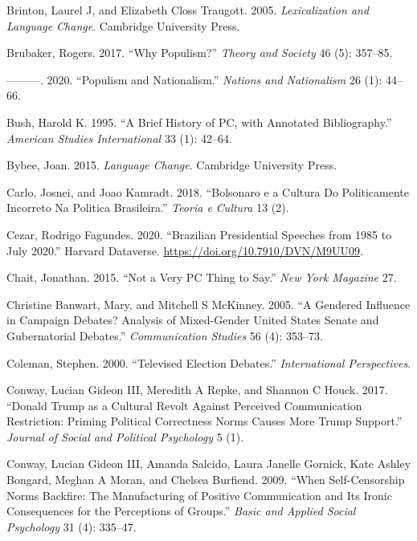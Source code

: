 \documentclass[
  12pt,
]{article}
\newlength{\cslhangindent}
\newlength{\cslentryspacingunit} %
\newenvironment{CSLReferences}[2] %
 {%
  \setlength{\parindent}{0pt}
  \ifodd #1
  \let\oldpar\par
  \def\par{\hangindent=\cslhangindent\oldpar}
  \fi
  \setlength{\parskip}{#2\cslentryspacingunit}
 }%
 {}
\begin{document}
\begin{CSLReferences}{1}{0}
\leavevmode{}%
Brinton, Laurel J, and Elizabeth Closs Traugott. 2005.
\emph{Lexicalization and Language Change}. Cambridge University Press.

\leavevmode{}%
Brubaker, Rogers. 2017. {``Why Populism?''} \emph{Theory and Society} 46
(5): 357--85.

\leavevmode{}%
---------. 2020. {``Populism and Nationalism.''} \emph{Nations and
Nationalism} 26 (1): 44--66.

\leavevmode{}%
Bush, Harold K. 1995. {``A Brief History of PC, with Annotated
Bibliography.''} \emph{American Studies International} 33 (1): 42--64.

\leavevmode{}%
Bybee, Joan. 2015. \emph{Language Change}. Cambridge University Press.

\leavevmode{}%
Carlo, Josnei, and Joao Kamradt. 2018. {``Bolsonaro e a Cultura Do
Politicamente Incorreto Na Politica Brasileira.''} \emph{Teoria e
Cultura} 13 (2).

\leavevmode{}%
Cezar, Rodrigo Fagundes. 2020. {``Brazilian Presidential Speeches from
1985 to July 2020.''} Harvard Dataverse.
\url{https://doi.org/10.7910/DVN/M9UU09}.

\leavevmode{}%
Chait, Jonathan. 2015. {``Not a Very PC Thing to Say.''} \emph{New York
Magazine} 27.

\leavevmode{}%
Christine Banwart, Mary, and Mitchell S McKinney. 2005. {``A Gendered
Influence in Campaign Debates? Analysis of Mixed-Gender United States
Senate and Gubernatorial Debates.''} \emph{Communication Studies} 56
(4): 353--73.

\leavevmode{}%
Coleman, Stephen. 2000. {``Televised Election Debates.''}
\emph{International Perspectives}.

\leavevmode{}%
Conway, Lucian Gideon III, Meredith A Repke, and Shannon C Houck. 2017.
{``Donald Trump as a Cultural Revolt Against Perceived Communication
Restriction: Priming Political Correctness Norms Causes More Trump
Support.''} \emph{Journal of Social and Political Psychology} 5 (1).

\leavevmode{}%
Conway, Lucian Gideon III, Amanda Salcido, Laura Janelle Gornick, Kate
Ashley Bongard, Meghan A Moran, and Chelsea Burfiend. 2009. {``When
Self-Censorship Norms Backfire: The Manufacturing of Positive
Communication and Its Ironic Consequences for the Perceptions of
Groups.''} \emph{Basic and Applied Social Psychology} 31 (4): 335--47.


\end{CSLReferences}
\end{document}

